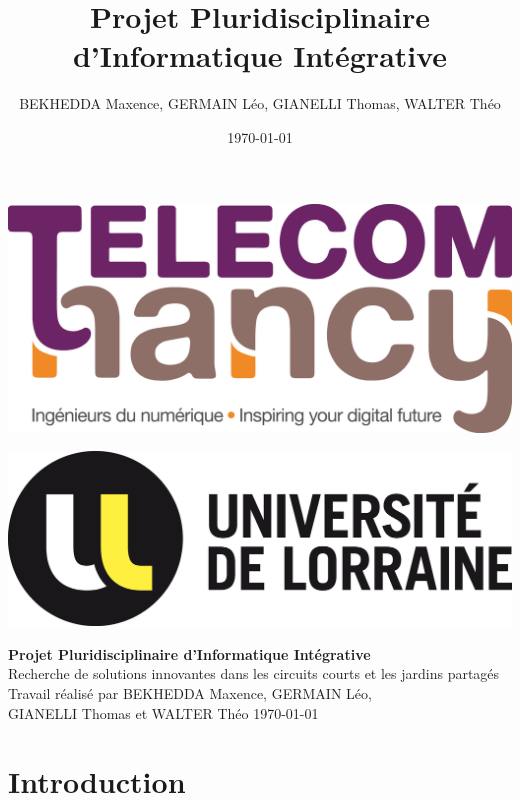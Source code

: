 \documentclass[11pt]{article}
\title{Projet Pluridisciplinaire d'Informatique Intégrative}
\author{BEKHEDDA Maxence, GERMAIN Léo, GIANELLI Thomas, WALTER Théo}
\date{\today}
\begin{document}
\thispagestyle{empty}
\vspace*{-1.5cm}

\hspace{-1.5cm}\includegraphics[scale=0.2]{logo_tn.jpg}
	
\vspace*{-1.6cm}
	
\hspace{13.5cm}\includegraphics[scale=0.2]{logo_ul.png}



\vspace*{5cm}	%
\begin{center}	%
{\huge \bf Projet Pluridisciplinaire d'Informatique Intégrative}\\	%
\vspace{3cm}
\Large Recherche de solutions innovantes dans les circuits courts et les jardins partagés\\
\vspace{3cm}
Travail réalisé par BEKHEDDA Maxence,
GERMAIN Léo, \\GIANELLI Thomas et WALTER Théo
\vfill	%
\today
\end{center}
\newpage


\tableofcontents
\newpage


\section{Introduction}
\end{document}

